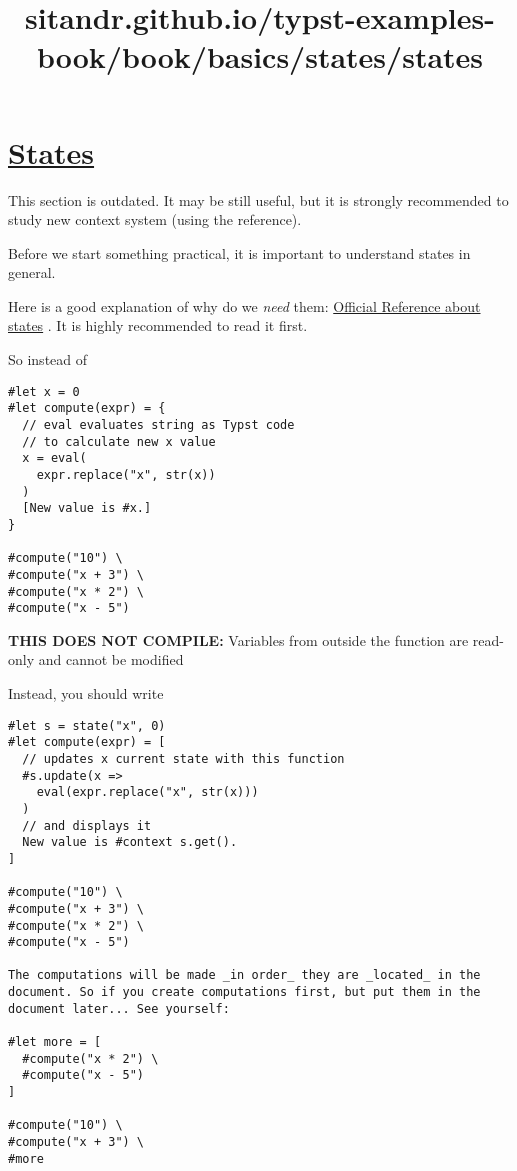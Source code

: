 \title{sitandr.github.io/typst-examples-book/book/basics/states/states}

\section{\texorpdfstring{\hyperref[states]{States}}{States}}\label{states}

This section is outdated. It may be still useful, but it is strongly
recommended to study new context system (using the reference).

Before we start something practical, it is important to understand
states in general.

Here is a good explanation of why do we \emph{need} them:
\href{https://typst.app/docs/reference/meta/state/}{Official Reference
about states} . It is highly recommended to read it first.

So instead of

\begin{verbatim}
#let x = 0
#let compute(expr) = {
  // eval evaluates string as Typst code
  // to calculate new x value
  x = eval(
    expr.replace("x", str(x))
  )
  [New value is #x.]
}

#compute("10") \
#compute("x + 3") \
#compute("x * 2") \
#compute("x - 5")
\end{verbatim}

\textbf{THIS DOES NOT COMPILE:} Variables from outside the function are
read-only and cannot be modified

Instead, you should write

\begin{verbatim}
#let s = state("x", 0)
#let compute(expr) = [
  // updates x current state with this function
  #s.update(x =>
    eval(expr.replace("x", str(x)))
  )
  // and displays it
  New value is #context s.get().
]

#compute("10") \
#compute("x + 3") \
#compute("x * 2") \
#compute("x - 5")

The computations will be made _in order_ they are _located_ in the document. So if you create computations first, but put them in the document later... See yourself:

#let more = [
  #compute("x * 2") \
  #compute("x - 5")
]

#compute("10") \
#compute("x + 3") \
#more
\end{verbatim}

\pandocbounded{}

